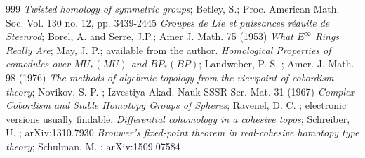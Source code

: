 \documentclass{article}
\newcommand{\6}{\partial}
\newcommand{\8}{\infty}
\begin{document}
\begin{thebibliography}{999}
 \textit{Twisted homology of symmetric groups}; Betley, S.; Proc. American Math. Soc. Vol. 130 no. 12, pp. 3439-2445
 \textit{Groupes de Lie et puissances r\'eduite de Steenrod}; Borel, A. and Serre, J.P.; Amer J. Math. 75 (1953)
 \textit{What $E^\infty$ Rings Really Are}; May, J. P.; available from the author.
 \textit{Homological Properties of comodules over $MU_*(MU)$ and $BP_*(BP)$}; Landweber, P. S. ; Amer. J. Math. 98 (1976)
 \textit{The methods of algebraic topology from the viewpoint of cobordism theory}; Novikov, S. P. ; Izvestiya Akad. Nauk SSSR Ser. Mat. 31 (1967)
 \textit{Complex Cobordism and Stable Homotopy Groups of Spheres}; Ravenel, D. C. ; electronic versions usually findable.
 \textit{Differential cohomology in a cohesive topos}; Schreiber, U. ; arXiv:1310.7930
 \textit{Brouwer's fixed-point theorem in real-cohesive homotopy type theory}; Schulman, M. ; arXiv:1509.07584
\end{thebibliography}
\end{document}
